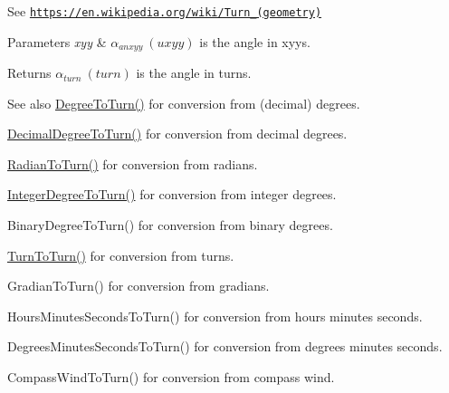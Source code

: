 See \href{https://en.wikipedia.org/wiki/Turn_(geometry)}{\tt https\+://en.\+wikipedia.\+org/wiki/\+Turn\+\_\+(geometry)} 
\begin{DoxyParams}{Parameters}
{\em xyy} & $\alpha_{anxyy}\ (uxyy)$ is the angle in xyys. \\
\hline
\end{DoxyParams}
\begin{DoxyReturn}{Returns}
$\alpha_{turn}\ (turn)$ is the angle in turns. 
\end{DoxyReturn}
\begin{DoxySeeAlso}{See also}
\mbox{\hyperlink{group___e_g_x_math-_angle_conversions-_degree_gafb4ce930493a7d6202ede3ee1630ef5d}{Degree\+To\+Turn()}} for conversion from (decimal) degrees. 

\mbox{\hyperlink{group___e_g_x_math-_angle_conversions-_decimal_degree_ga396a13c10acdef5026c12f3217b142c1}{Decimal\+Degree\+To\+Turn()}} for conversion from decimal degrees. 

\mbox{\hyperlink{group___e_g_x_math-_angle_conversions-_radian_ga8492d6d2f6467c619b65e5fb75a9ae04}{Radian\+To\+Turn()}} for conversion from radians. 

\mbox{\hyperlink{group___e_g_x_math-_angle_conversions-_integer_degree_ga06ddbdada5a3978105c855d4aae735ae}{Integer\+Degree\+To\+Turn()}} for conversion from integer degrees. 

Binary\+Degree\+To\+Turn() for conversion from binary degrees. 

\mbox{\hyperlink{group___e_g_x_math-_angle_conversions-_turn_ga32c8dfa2861fefd0b18e36f8d6d95ed4}{Turn\+To\+Turn()}} for conversion from turns. 

Gradian\+To\+Turn() for conversion from gradians. 

Hours\+Minutes\+Seconds\+To\+Turn() for conversion from hours minutes seconds. 

Degrees\+Minutes\+Seconds\+To\+Turn() for conversion from degrees minutes seconds. 

Compass\+Wind\+To\+Turn() for conversion from compass wind. 
\end{DoxySeeAlso}

